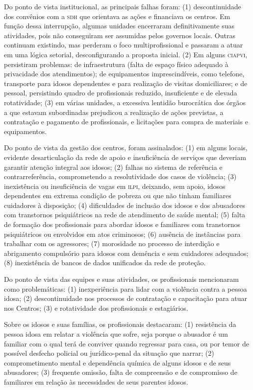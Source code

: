 \documentclass{article}
\begin{document}
Do ponto de vista institucional, as principais falhas foram: (1) descontinuidade
dos convênios com a \textsc{sdh} que orientava as ações e financiava os centros. Em
função dessa interrupção, algumas unidades encerraram definitivamente suas
atividades, pois não conseguiram ser assumidas pelos governos locais. Outras
continuam existindo, mas perderam o foco multiprofissional e passaram a atuar em
uma lógica setorial, desconfigurando a proposta inicial. (2) Em alguns \textsc{ciapvi},
persistiram problemas: de infraestrutura (falta de espaço físico adequado à
privacidade dos atendimentos); de equipamentos imprescindíveis, como telefone,
transporte para idosos dependentes e para realização de visitas domiciliares; e
de pessoal, persistindo quadro de profissionais reduzido, insuficiente e de
elevada rotatividade; (3) em várias unidades, a excessiva lentidão burocrática
dos órgãos a que estavam subordinadas prejudicou a realização de ações
previstas, a contratação e pagamento de profissionais, e licitações para compra
de materiais e equipamentos.

Do ponto de vista da gestão dos centros, foram assinalados: (1) em alguns
locais, evidente desarticulação da rede de apoio e insuficiência de serviços que
deveriam garantir atenção integral aos idosos; (2) falhas no sistema de
referência e contrarreferência, comprometendo a resolutividade dos casos de
violência; (3) inexistência ou insuficiência de vagas em \textsc{ilpi}, deixando, sem
apoio, idosos dependentes em extrema condição de pobreza ou que não tinham
familiares cuidadores à disposição; (4) dificuldades de inclusão dos idosos e
dos abusadores com transtornos psiquiátricos na rede de atendimento de saúde
mental; (5) falta de formação dos profissionais para abordar idosos e familiares
com transtornos psiquiátricos ou envolvidos em atos criminosos; (6) ausência de
instâncias para trabalhar com os agressores; (7) morosidade no processo de
interdição e abrigamento compulsório para idosos com demência e sem cuidadores
adequados; (8) inexistência de bancos de dados unificados da rede de proteção.

Do ponto de vista das equipes e suas atividades, os profissionais mencionaram
como problemáticas: (1) inexperiência para lidar com a violência contra a pessoa
idosa; (2) descontinuidade nos processos de contratação e capacitação para atuar
nos Centros; (3) e rotatividade dos profissionais e estagiários.

Sobre os idosos e suas famílias, os profissionais destacaram: (1) resistência da
pessoa idosa em relatar a violência que sofre, seja porque o abusador é um
familiar com o qual terá de conviver quando regressar para casa, ou por temor de
possível desfecho policial ou jurídico-penal da situação que narrar; (2)
comprometimento mental e dependência química de alguns idosos e de seus
abusadores; (3) frequente omissão, falta de compreensão e de compromisso de
familiares em relação às necessidades de seus parentes idosos.
\end{document}

